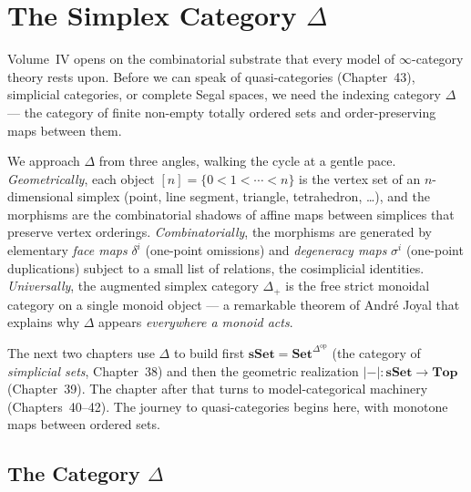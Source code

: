 
\chapter{The Simplex Category $\Delta$}

\begin{overviewbox}
Volume~IV opens on the combinatorial substrate that every model of
$\infty$-category theory rests upon. Before we can speak of quasi-categories
(Chapter~43), simplicial categories, or complete Segal spaces, we need the
indexing category $\Delta$ — the category of finite non-empty totally
ordered sets and order-preserving maps between them.

We approach $\Delta$ from three angles, walking the cycle at a gentle
pace. \emph{Geometrically}, each object $[n] = \{0 < 1 < \cdots < n\}$ is
the vertex set of an $n$-dimensional simplex (point, line segment,
triangle, tetrahedron, \ldots), and the morphisms are the combinatorial
shadows of affine maps between simplices that preserve vertex orderings.
\emph{Combinatorially}, the morphisms are generated by elementary
\emph{face maps} $\delta^i$ (one-point omissions) and \emph{degeneracy
maps} $\sigma^i$ (one-point duplications) subject to a small list of
relations, the cosimplicial identities. \emph{Universally}, the augmented
simplex category $\Delta_+$ is the free strict monoidal category on a
single monoid object — a remarkable theorem of André Joyal that explains
why $\Delta$ appears \emph{everywhere a monoid acts}.

The next two chapters use $\Delta$ to build first $\mathbf{sSet} =
\mathbf{Set}^{\Delta^{\mathrm{op}}}$ (the category of \emph{simplicial sets},
Chapter~38) and then the geometric realization $\lvert{-}\rvert :
\mathbf{sSet} \to \mathbf{Top}$ (Chapter~39). The chapter after that
turns to model-categorical machinery (Chapters~40--42). The journey to
quasi-categories begins here, with monotone maps between ordered sets.
\end{overviewbox}


\section{The Category $\Delta$}
\label{sec:delta-category}


